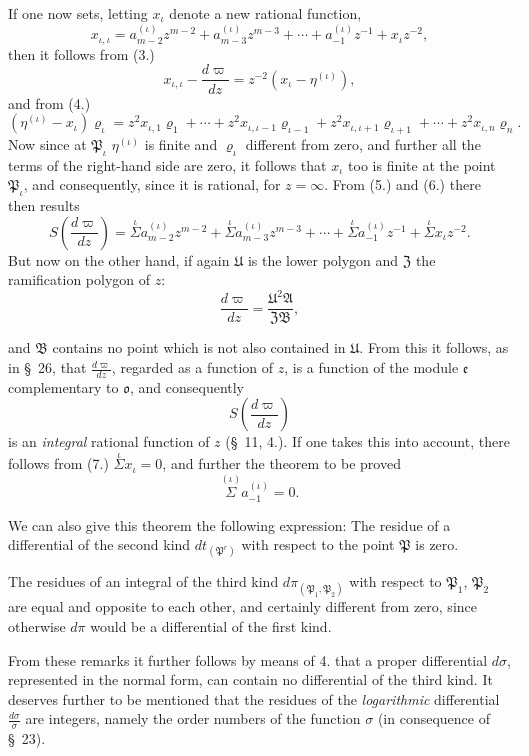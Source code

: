 \documentclass{article}
\begin{document}
If one now sets, letting $x_{\iota}$ denote a new rational function,
\[ x_{\iota,\iota} = a_{m-2}^{(\iota)}z^{m-2}+a_{m-3}^{(\iota)}z^{m-3}+\cdots+a_{-1}^{(\iota)}z^{-1}+x_{\iota}z^{-2}, \tag{6.} \]
then it follows from (3.)
\[ x_{\iota,\iota}-\frac{d\varpi}{dz} = z^{-2}(x_{\iota}-\eta^{(\iota)}), \]
and from (4.)
\[ (\eta^{(\iota)}-x_{\iota})\varrho_{\iota} = z^{2}x_{\iota,1}\varrho_{1}+\cdots+z^{2}x_{\iota,\iota-1}\varrho_{\iota-1}+z^{2}x_{\iota,\iota+1}\varrho_{\iota+1}+\cdots+z^{2}x_{\iota,n}\varrho_{n}. \]
Now since at $\mathfrak{P}_{\iota}$ $\eta^{(\iota)}$ is finite and $\varrho_{\iota}$ different from zero, and further all the terms of the right-hand side are zero, it follows that $x_{\iota}$ too is finite at the point $\mathfrak{P}_{\iota}$, and consequently, since it is rational, for $z = \infty$. From (5.) and (6.) there then results
\[ S\left(\frac{d\varpi}{dz}\right) = \overset{\iota}{\Sigma} a_{m-2}^{(\iota)}z^{m-2}+\overset{\iota}{\Sigma} a_{m-3}^{(\iota)}z^{m-3}+\cdots+\overset{\iota}{\Sigma} a_{-1}^{(\iota)}z^{-1}+\overset{\iota}{\Sigma} x_{\iota}z^{-2}. \tag{7.} \]
But now on the other hand, if again $\mathfrak{U}$ is the lower polygon and $\mathfrak{Z}$ the ramification polygon of $z$:
\[ \frac{d\varpi}{dz} = \frac{\mathfrak{U}^{2}\mathfrak{A}}{\mathfrak{Z}\mathfrak{B}}, \]

and $\mathfrak{B}$ contains no point which is not also contained in $\mathfrak{U}$. From this it follows, as in §~26, that $\frac{d\varpi}{dz}$, regarded as a function of $z$, is a function of the module $\mathfrak{e}$ complementary to $\mathfrak{o}$, and consequently
\[ S\left(\frac{d\varpi}{dz}\right) \]
is an \emph{integral} rational function of $z$ (§~11, 4.). If one takes this into account, there follows from (7.) $\overset{\iota}{\Sigma} x_{\iota} = 0$, and further the theorem to be proved
\[ \overset{(\iota)}{\Sigma} a_{-1}^{(\iota)} = 0. \]

We can also give this theorem the following expression: The residue of a differential of the second kind $dt_{(\mathfrak{P}^{r})}$ with respect to the point $\mathfrak{P}$ is zero.

The residues of an integral of the third kind $d\pi_{(\mathfrak{P}_{1}, \mathfrak{P}_{2})}$ with respect to $\mathfrak{P}_{1}$, $\mathfrak{P}_{2}$ are equal and opposite to each other, and certainly different from zero, since otherwise $d\pi$ would be a differential of the first kind.

From these remarks it further follows by means of 4. that a proper differential $d\sigma$, represented in the normal form, can contain no differential of the third kind. It deserves further to be mentioned that the residues of the \emph{logarithmic} differential $\frac{d\sigma}{\sigma}$ are integers, namely the order numbers of the function $\sigma$ (in consequence of §~23).
\end{document}
